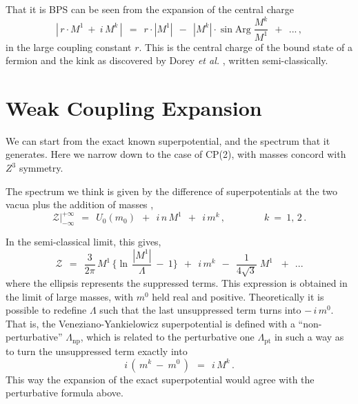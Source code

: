\documentclass[epsfig,12pt]{article}
\def\beq{\begin{equation}}
\def\eeq{\end{equation}}
\def\beq{\begin{equation}}
\def\eeq{\end{equation}}
\newcommand{\mc}[1]{\mathcal{#1}}
\begin{document}
       That it is BPS can be seen from the expansion of the central charge
\beq
       |\, r \cdot M^1  ~+~ i\, M^k \,|  ~~=~~ r \cdot | M^1 |  ~~-~~ | M^k | \cdot \sin \text{Arg}\; \frac { M^k } 
                                                                                                            { M^1 }  
                                                                ~~+~~ ... \,,
\eeq
       in the large coupling constant $ r $.
       This is the central charge of the bound state of a fermion and the kink 
       as discovered by Dorey {\it et al.} \cite{Dorey:1999zk}, written semi-classically.


\section{Weak Coupling Expansion}
\setcounter{equation}{0}

       We can start from the exact known superpotential, and the spectrum that it generates.
       Here we narrow down to the case of CP(2), with masses concord with $ Z^3 $ symmetry.

       The spectrum we think is given by the difference of superpotentials at the two vacua 
       plus the addition of masses \cite{Bolokhov:2011mp},
\beq
       \mc{Z}\Big|^{\scriptscriptstyle +\infty}_{\scriptscriptstyle -\infty} ~~=~~
       U_0(m_0)  ~~+~~ i\, n\, M^1 ~~+~~ i\, m^k\,,
       \qquad\qquad k~=~1,\,2\,.
\eeq

       In the semi-classical limit, this gives,
\beq
       \mc{Z} ~~=~~
       \frac{3}{2\pi}\, M^1\, \Big\{ \ln\, \frac {   |M^1|   }
                                                 {  \Lambda  } ~-~ 1 \Big\}
       ~~+~~ i\, m^k 
       ~~-~~ \frac{1}{4\sqrt{3}}\; M^1\, 
       ~~+~~ ...
\eeq
       where the ellipsis represents the suppressed terms.
       This expression is obtained in the limit of large masses, with $ m^0 $ held real and positive. 
       Theoretically it is possible to redefine $ \Lambda $ such that the last unsuppressed term
       turns into $ -\, i\, m^0 $.
       That is, the Veneziano-Yankielowicz superpotential is defined with a ``non-perturbative'' 
       $ \Lambda_\text{np} $, which is related to the perturbative one $ \Lambda_\text{pt} $ in such 
       a way as to turn the unsuppressed term exactly into
\beq
       i \, (\, m^k ~-~ m^0 \,)  ~~=~~ i\, M^k\,.
\eeq
       This way the expansion of the exact superpotential would agree with the perturbative formula above.
\end{document}
